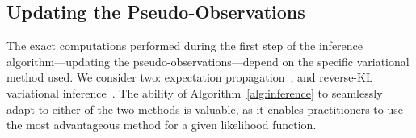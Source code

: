 \subsection{Updating the Pseudo-Observations}
\label{kks:sec:inf-pseudo-obs}

The exact computations performed during the first step of the inference algorithm---updating the pseudo-observations---depend on the specific variational method used.
We consider two: expectation propagation~\citep{minka2001family}, and reverse-KL variational inference~\citep{blei2017variational}.
The ability of Algorithm~\ref{alg:inference} to seamlessly adapt to either of the two methods is valuable, as it enables practitioners to use the most advantageous method for a given likelihood function.



